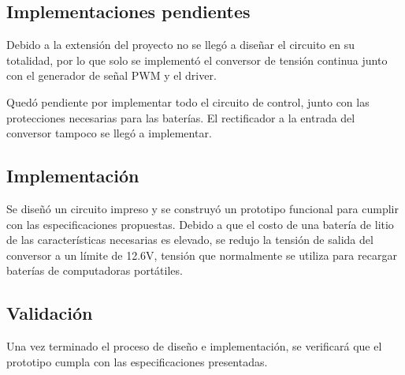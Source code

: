 \subsection{Implementaciones pendientes}
Debido a la extensión del proyecto no se llegó a diseñar el circuito en su totalidad,
por lo que solo se implementó el conversor de tensión continua
junto con el generador de señal PWM y el driver.

Quedó pendiente por implementar todo el circuito de control,
junto con las protecciones necesarias para las baterías.
El rectificador a la entrada del conversor tampoco se llegó a implementar.

\subsection{Implementación}
Se diseñó un circuito impreso y se construyó un prototipo funcional para cumplir con las especificaciones propuestas. 
Debido a que el costo de una batería de litio de las características necesarias es elevado,
se redujo la tensión de salida del conversor a un límite de 12.6V,
tensión que normalmente se utiliza para recargar baterías de computadoras portátiles.

\subsection{Validación}
Una vez terminado el proceso de diseño e implementación,
se verificará que el prototipo cumpla con las especificaciones presentadas.
